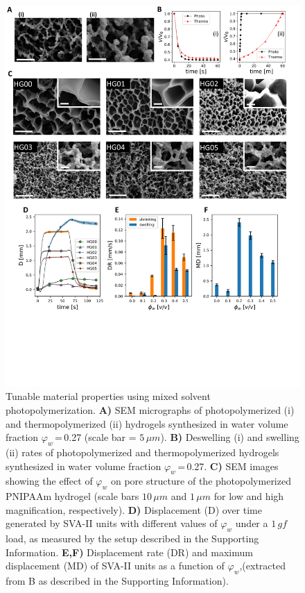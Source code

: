 \begin{figure}[t]
\centering
\includegraphics[width=\textwidth]{fig2.pdf}
\caption{Tunable material properties using mixed solvent photopolymerization.
\textbf{A)} SEM micrographs of photopolymerized (i) and thermopolymerized (ii) hydrogels synthesized in water volume fraction \(\varphi_{w}\)\,=\,0.27 (scale bar = $5\,\mu m$). \textbf{B)} Deswelling (i) and swelling (ii) rates of photopolymerized and thermopolymerized hydrogels synthesized in water volume fraction \(\varphi_{w}\)\,=\,0.27. \textbf{C)} SEM images showing the effect of $\varphi_w$ on pore structure of the photopolymerized PNIPAAm hydrogel (scale bars $10\,\mu m$ and $1\,\mu m$ for low and high magnification, respectively). \textbf{D)} Displacement (D) over time generated by SVA-II units with different values of \(\varphi_{w}\)  under a $1\,gf$ load, as measured by the setup described in the Supporting Information. \textbf{E,F)} Displacement rate (DR) and maximum displacement (MD) of SVA-II units as a function of $\varphi_w$,(extracted from B as described in the Supporting Information).}
\label{fig:2}
\end{figure}
